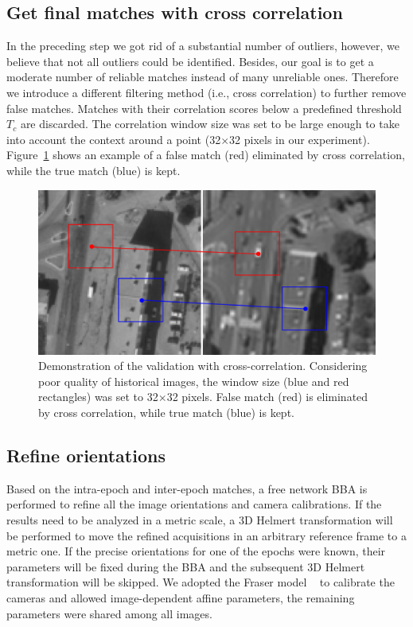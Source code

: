 \subsection{Get final matches with cross correlation}
In the preceding step we got rid of a substantial number of outliers, however, we believe that not all outliers could be identified. 
Besides, our goal is to get a moderate number of reliable matches instead of many unreliable ones. Therefore we introduce a different filtering method (i.e., cross correlation) to further remove false matches.  
Matches with their correlation scores below a predefined threshold $T_c$ are discarded. The correlation window size was set to be large enough to take into account the context around a point (32$\times$32 pixels in our experiment). Figure~\ref{crossc} shows an example of a false match (red) eliminated by cross correlation, while the true match (blue) is kept.\\
\begin{figure}[htbp]
	\begin{center}
		\includegraphics[width=0.8\columnwidth]{images/Chapitre4/tiept.png}
		\caption{Demonstration of the validation with cross-correlation. Considering poor quality of historical images, the window size (blue and red rectangles) was set to 32$\times$32 pixels. False match (red) is eliminated by cross correlation, while true match (blue) is kept.}
		\label{crossc}
	\end{center}
\end{figure}

\subsection{Refine orientations}
Based on the intra-epoch and inter-epoch matches, a free network \ac{BBA} is performed to refine all the image orientations and camera calibrations. If the results need to be analyzed in a metric scale, a 3D Helmert transformation will be performed to move the refined acquisitions in an arbitrary reference frame to a metric one. If the precise orientations for one of the epochs were known, their parameters will be fixed during the \ac{BBA} and the subsequent 3D Helmert transformation will be skipped.
We adopted the Fraser model ~\cite{fraser1997digital} to calibrate the cameras and allowed image-dependent affine parameters, the remaining parameters were shared among all images.

